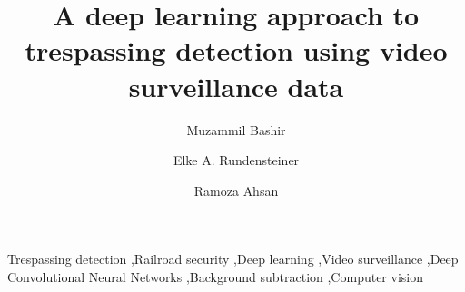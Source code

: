 \documentclass[preprint,3p,times,twocolumn]{elsarticle}
\begin{document}
\begin{frontmatter}
\title{A deep learning approach to trespassing detection using video surveillance data}


\author{Muzammil Bashir}
\author{Elke A. Rundensteiner}
\author{Ramoza Ahsan}

\address{Department of Computer Science, Worcester Polytechnic Institute, United States}





\begin{keyword}
Trespassing detection \sep Railroad security \sep Deep learning \sep Video surveillance \sep Deep Convolutional Neural Networks \sep Background subtraction \sep Computer vision
\end{keyword}

\end{frontmatter}











\end{document}
